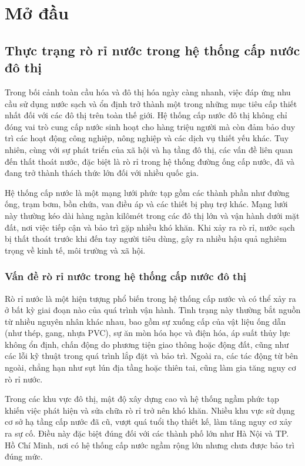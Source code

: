 \chapter{Mở đầu}
\section{Thực trạng rò rỉ nước trong hệ thống cấp nước đô thị}

Trong bối cảnh toàn cầu hóa và đô thị hóa ngày càng nhanh, việc đáp ứng nhu cầu sử dụng nước sạch và ổn định trở thành một trong những mục tiêu cấp thiết nhất đối với các đô thị trên toàn thế giới. Hệ thống cấp nước đô thị không chỉ đóng vai trò cung cấp nước sinh hoạt cho hàng triệu người mà còn đảm bảo duy trì các hoạt động công nghiệp, nông nghiệp và các dịch vụ thiết yếu khác. Tuy nhiên, cùng với sự phát triển của xã hội và hạ tầng đô thị, các vấn đề liên quan đến thất thoát nước, đặc biệt là rò rỉ trong hệ thống đường ống cấp nước, đã và đang trở thành thách thức lớn đối với nhiều quốc gia.

Hệ thống cấp nước là một mạng lưới phức tạp gồm các thành phần như đường ống, trạm bơm, bồn chứa, van điều áp và các thiết bị phụ trợ khác. Mạng lưới này thường kéo dài hàng ngàn kilômét trong các đô thị lớn và vận hành dưới mặt đất, nơi việc tiếp cận và bảo trì gặp nhiều khó khăn. Khi xảy ra rò rỉ, nước sạch bị thất thoát trước khi đến tay người tiêu dùng, gây ra nhiều hậu quả nghiêm trọng về kinh tế, môi trường và xã hội. 

\subsection{Vấn đề rò rỉ nước trong hệ thống cấp nước đô thị}

Rò rỉ nước là một hiện tượng phổ biến trong hệ thống cấp nước và có thể xảy ra ở bất kỳ giai đoạn nào của quá trình vận hành. Tình trạng này thường bắt nguồn từ nhiều nguyên nhân khác nhau, bao gồm sự xuống cấp của vật liệu ống dẫn (như thép, gang, nhựa PVC), sự ăn mòn hóa học và điện hóa, áp suất thủy lực không ổn định, chấn động do phương tiện giao thông hoặc động đất, cũng như các lỗi kỹ thuật trong quá trình lắp đặt và bảo trì. Ngoài ra, các tác động từ bên ngoài, chẳng hạn như sụt lún địa tầng hoặc thiên tai, cũng làm gia tăng nguy cơ rò rỉ nước.

Trong các khu vực đô thị, mật độ xây dựng cao và hệ thống ngầm phức tạp khiến việc phát hiện và sửa chữa rò rỉ trở nên khó khăn. Nhiều khu vực sử dụng cơ sở hạ tầng cấp nước đã cũ, vượt quá tuổi thọ thiết kế, làm tăng nguy cơ xảy ra sự cố. Điều này đặc biệt đúng đối với các thành phố lớn như Hà Nội và TP. Hồ Chí Minh, nơi có hệ thống cấp nước ngầm rộng lớn nhưng chưa được bảo trì đúng mức.

